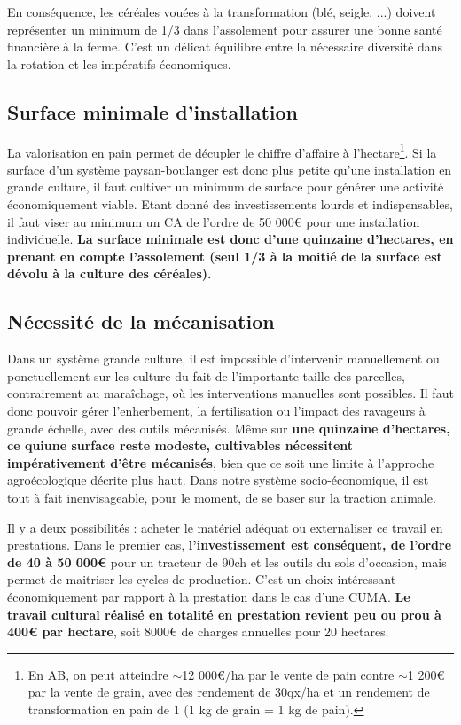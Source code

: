 \documentclass{book}
\begin{document}
En conséquence, les céréales vouées à la transformation (blé, seigle, ...) doivent représenter un minimum de 1/3 dans l'assolement pour assurer une bonne santé financière à la ferme. C'est un délicat équilibre entre la nécessaire diversité dans la rotation et les impératifs économiques.

\subsection{Surface minimale d'installation}

La valorisation en pain permet de décupler le chiffre d'affaire à l'hectare\footnote{En AB, on peut atteindre $\sim$12 000\euro{}/ha par le vente de pain contre $\sim$1 200\euro{} par la vente de grain, avec des rendement de 30qx/ha et un rendement de transformation en pain de 1 (1 kg de grain = 1 kg de pain).}. Si la surface d'un système paysan-boulanger est donc plus petite qu'une installation en grande culture, il faut cultiver un minimum de surface pour générer une activité économiquement viable. Etant donné des investissements lourds et indispensables, il faut viser au minimum un CA de l'ordre de 50 000\euro{} pour une installation individuelle. \textbf{La surface minimale est donc d'une quinzaine d'hectares, en prenant en compte l'assolement (seul 1/3 à la moitié de la surface est dévolu à la culture des céréales).} 

\subsection{Nécessité de la mécanisation}

Dans un système grande culture, il est impossible d’intervenir manuellement ou ponctuellement sur les culture du fait de l’importante taille des parcelles, contrairement au maraîchage, où les interventions manuelles sont possibles. Il faut donc pouvoir gérer l’enherbement, la fertilisation ou l’impact des ravageurs à grande échelle, avec des outils mécanisés. Même sur \textbf{une quinzaine d'hectares, ce quiune surface reste modeste, cultivables nécessitent impérativement d'être mécanisés}, bien que ce soit une limite à l'approche agroécologique décrite plus haut. Dans notre système socio-économique, il est tout à fait inenvisageable, pour le moment, de se baser sur la traction animale. 

Il y a deux possibilités : acheter le matériel adéquat ou externaliser ce travail en prestations. Dans le premier cas, \textbf{l'investissement est conséquent, de l'ordre de 40 à 50 000\euro{}} pour un tracteur de 90ch et les outils du sols d'occasion, mais permet de maitriser les cycles de production. C'est un choix intéressant économiquement par rapport à la prestation dans le cas d'une CUMA. \textbf{Le travail cultural réalisé en totalité en prestation revient peu ou prou à 400\euro{} par hectare}, soit 8000\euro{} de charges annuelles pour 20 hectares.
\end{document}
